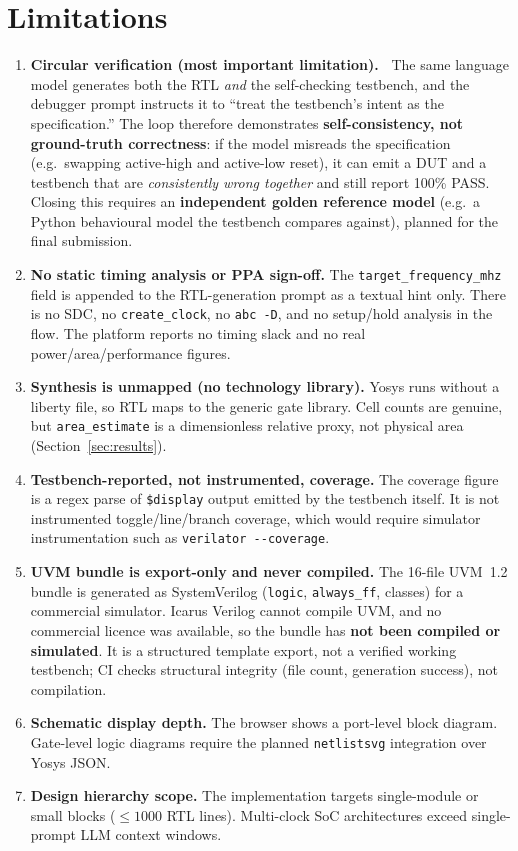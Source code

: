 \documentclass[11pt,a4paper]{article}
\begin{document}
\section{Limitations}
\label{sec:limits}

\begin{enumerate}[label=\textbf{L\arabic*.},ref=L\arabic*]
\item \textbf{Circular verification (most important limitation).\ }
\label{lim:circular}The same language model generates both the RTL \emph{and} the
self-checking testbench, and the debugger prompt instructs it to ``treat the
testbench's intent as the specification.'' The loop therefore demonstrates
\textbf{self-consistency, not ground-truth correctness}: if the model misreads the
specification (e.g.\ swapping active-high and active-low reset), it can emit a DUT
and a testbench that are \emph{consistently wrong together} and still report 100\%
PASS. Closing this requires an \textbf{independent golden reference model} (e.g.\
a Python behavioural model the testbench compares against), planned for the final
submission.
\item \textbf{No static timing analysis or PPA sign-off.}
\label{lim:sta}The \texttt{target\_frequency\_mhz} field is appended to the
RTL-generation prompt as a textual hint only. There is no SDC, no
\texttt{create\_clock}, no \texttt{abc -D}, and no setup/hold analysis in the flow.
The platform reports no timing slack and no real power/area/performance figures.
\item \textbf{Synthesis is unmapped (no technology library).}
\label{lim:mapping}Yosys runs without a liberty file, so RTL maps to the generic
gate library. Cell counts are genuine, but \texttt{area\_estimate} is a
dimensionless relative proxy, not physical area (Section~\ref{sec:results}).
\item \textbf{Testbench-reported, not instrumented, coverage.}
\label{lim:cov}The coverage figure is a regex parse of \texttt{\$display} output
emitted by the testbench itself. It is not instrumented toggle/line/branch
coverage, which would require simulator instrumentation such as
\texttt{verilator {-}{-}coverage}.
\pagebreak
\item \textbf{UVM bundle is export-only and never compiled.}
\label{lim:uvm}The 16-file UVM~1.2 bundle is generated as SystemVerilog
(\texttt{logic}, \texttt{always\_ff}, classes) for a commercial simulator. Icarus
Verilog cannot compile UVM, and no commercial licence was available, so the bundle
has \textbf{not been compiled or simulated}. It is a structured template export,
not a verified working testbench; CI checks structural integrity (file count,
generation success), not compilation.
\item \textbf{Schematic display depth.} The browser shows a port-level block
diagram. Gate-level logic diagrams require the planned \texttt{netlistsvg}
integration over Yosys JSON.
\item \textbf{Design hierarchy scope.} The implementation targets single-module or
small blocks ($\le 1000$ RTL lines). Multi-clock SoC architectures exceed
single-prompt LLM context windows.
\end{enumerate}
\end{document}

